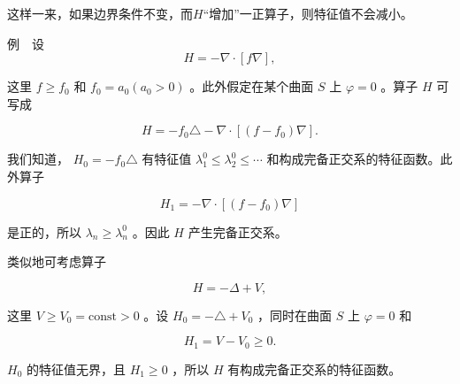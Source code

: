这样一来，如果边界条件不变，而$H$“增加”一正算子，则特征值不会减小。

例　设
\begin{equation*}
H = - \nabla \cdot [ f \nabla ],
\end{equation*}

这里 $f \geqslant f_0$ 和 $f_0 = a_0 (a_0 > 0)$ 。此外假定在某个曲面 $S$ 上 $\varphi = 0$ 。算子 $H$ 可写成

\begin{equation*}
H = - f _ {0} \triangle - \nabla \cdot [ (f - f _ {0}) \nabla ].
\end{equation*}

我们知道， $H_{0}=-f_{0}\triangle$ 有特征值 $\lambda_{1}^{0}\leqslant\lambda_{2}^{0}\leqslant\cdots$ 和构成完备正交系的特征函数。此外算子

\begin{equation*}
H _ {1} = - \nabla \cdot [ (f - f _ {0}) \nabla ]
\end{equation*}

是正的，所以 $\lambda_{n} \geqslant \lambda_{n}^{0}$ 。因此 $H$ 产生完备正交系。

类似地可考虑算子

\begin{equation*}
H = - \Delta + V,
\end{equation*}

这里 $V \geqslant V_{0} = \mathrm{const} > 0$ 。设 $H_{0} = -\triangle + V_{0}$ ，同时在曲面 $S$ 上 $\varphi = 0$ 和

\begin{equation*}
H _ {1} = V - V _ {0} \geqslant 0.
\end{equation*}

$H_{0}$ 的特征值无界，且 $H_{1} \geqslant 0$ ，所以 $H$ 有构成完备正交系的特征函数。
